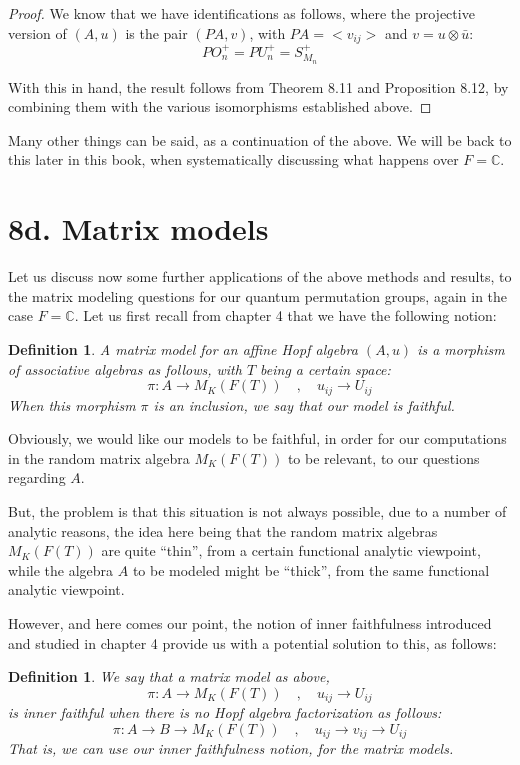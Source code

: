 \documentclass[12pt]{amsbook}
\newtheorem{definition}[theorem]{Definition}
\begin{document}
\begin{proof}
We know that we have identifications as follows, where the projective version of $(A,u)$ is the pair $(PA,v)$, with $PA=<v_{ij}>$ and $v=u\otimes\bar{u}$:
$$PO_n^+=PU_n^+=S_{M_n}^+$$

With this in hand, the result follows from Theorem 8.11 and Proposition 8.12, by combining them with the various isomorphisms established above.
\end{proof}

Many other things can be said, as a continuation of the above. We will be back to this later in this book, when systematically discussing what happens over $F=\mathbb C$.

\section*{8d. Matrix models} 

Let us discuss now some further applications of the above methods and results, to the matrix modeling questions for our quantum permutation groups, again in the case $F=\mathbb C$. Let us first recall from chapter 4 that we have the following notion:

\begin{definition}
A matrix model for an affine Hopf algebra $(A,u)$ is a morphism of associative algebras as follows, with $T$ being a certain space:
$$\pi:A\to M_K(F(T))\quad,\quad u_{ij}\to U_{ij}$$
When this morphism $\pi$ is an inclusion, we say that our model is faithful.
\end{definition}

Obviously, we would like our models to be faithful, in order for our computations in the random matrix algebra $M_K(F(T))$ to be relevant, to our questions regarding $A$. 

\bigskip

But, the problem is that this situation is not always possible, due to a number of analytic reasons, the idea here being that the random matrix algebras $M_K(F(T))$ are quite ``thin'', from a certain functional analytic viewpoint, while the algebra $A$ to be modeled might be ``thick'', from the same functional analytic viewpoint.

\bigskip

However, and here comes our point, the notion of inner faithfulness introduced and studied in chapter 4 provide us with a potential solution to this, as follows:

\begin{definition}
We say that a matrix model as above,
$$\pi:A\to M_K(F(T))\quad,\quad u_{ij}\to U_{ij}$$
is inner faithful when there is no Hopf algebra factorization as follows:
$$\pi:A\to B\to M_K(F(T))\quad,\quad u_{ij}\to v_{ij}\to U_{ij}$$
That is, we can use our inner faithfulness notion, for the matrix models.
\end{definition} 
\end{document}
